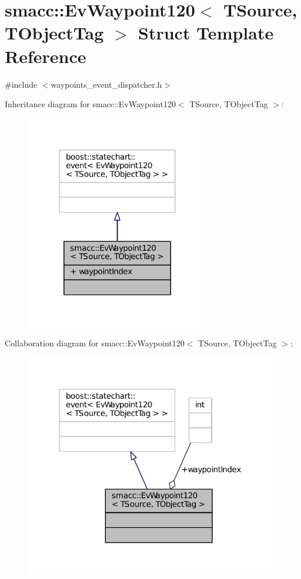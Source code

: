 \hypertarget{structsmacc_1_1EvWaypoint120}{}\section{smacc\+:\+:Ev\+Waypoint120$<$ T\+Source, T\+Object\+Tag $>$ Struct Template Reference}
\label{structsmacc_1_1EvWaypoint120}


{\ttfamily \#include $<$waypoints\+\_\+event\+\_\+dispatcher.\+h$>$}



Inheritance diagram for smacc\+:\+:Ev\+Waypoint120$<$ T\+Source, T\+Object\+Tag $>$\+:
\nopagebreak
\begin{figure}[H]
\begin{center}
\leavevmode
\includegraphics[width=227pt]{structsmacc_1_1EvWaypoint120__inherit__graph}
\end{center}
\end{figure}


Collaboration diagram for smacc\+:\+:Ev\+Waypoint120$<$ T\+Source, T\+Object\+Tag $>$\+:
\nopagebreak
\begin{figure}[H]
\begin{center}
\leavevmode
\includegraphics[width=312pt]{structsmacc_1_1EvWaypoint120__coll__graph}
\end{center}
\end{figure}
